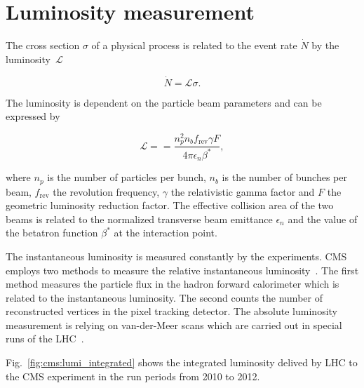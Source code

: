 \section{Luminosity measurement}

The cross section $\sigma$ of a physical process is related to the
event rate $\dot{N}$ by the luminosity~$\mathcal{L}$

\begin{equation*}
    \dot{N} = \mathcal{L} \sigma.
\end{equation*}

The luminosity is dependent on the particle beam parameters and can be expressed
by

\begin{equation*}
    \mathcal{L} = = \frac{n_p^2
        n_b f_\mathrm{rev} \gamma F}{4 \pi \epsilon_n \beta^*},
\end{equation*}

where $n_p$ is the number of particles per bunch, $n_b$ is the number of bunches
per beam, $f_\mathrm{rev}$ the revolution frequency, $\gamma$ the relativistic
gamma factor and $F$ the geometric luminosity reduction factor. The effective
collision area of the two beams is related to the normalized transverse beam
emittance $\epsilon_n$ and the value of the betatron function $\beta^*$ at the
interaction point.

The instantaneous luminosity is measured constantly by the experiments. CMS
employs two methods to measure the relative instantaneous
luminosity~\cite{CMS-PAS-LUM-13-001}. The first method measures the particle
flux in the hadron forward calorimeter which is related to the instantaneous
luminosity. The second counts the number of reconstructed vertices in the pixel
tracking detector. The absolute luminosity measurement is relying on
van-der-Meer scans which are carried out in special runs of the
LHC~\cite{vanderMeer:296752}.

Fig.~\ref{fig:cms:lumi_integrated} shows the integrated luminosity delived by
LHC to the CMS experiment in the run periods from 2010 to 2012.

